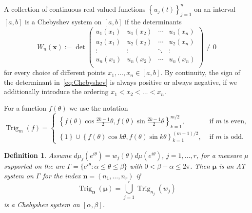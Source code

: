 \documentclass[reqno,centertags,11pt,draft]{amsart}
\newtheorem{defn}[thm]{Definition}
\newcommand{\T}{\mathbb{\partial\mathbb{D}}}
\newcommand{\set}[1]{\left\{#1\right\}}
\begin{document}
    A collection of continuous real-valued functions $\set{u_j(t)}_{j=1}^n$ on an interval $[a,b]$ is a Chebyshev system on $[a,b]$ if the determinants
    \begin{equation}\label{eq:Chebyshev}
        W_n(\bm{x}):=\det
        \begin{pmatrix}
            u_1(x_1) & u_1(x_2) & \cdots & u_1(x_n) \\
            u_2(x_1) & u_2(x_2) & \cdots & u_2(x_n) \\
            \vdots & \vdots & \ddots & \vdots \\
            u_n(x_1) & u_n(x_2) & \cdots & u_n(x_n) \\
        \end{pmatrix} \ne 0
    \end{equation}
    for every choice of different points $x_1,\ldots,x_n\in[a,b]$. By continuity, the sign of the determinant in~\eqref{eq:Chebyshev} is always positive or always negative, if we additionally introduce the ordering $x_1<x_2<\ldots<x_n$. %

    For a function $f(\theta)$ we use the notation
    \begin{equation}
        \operatorname{Trig}_m(f) = \begin{cases}
            \set{f(\theta)\cos{\frac{2k-1}{2}\theta},f(\theta)\sin{\frac{2k-1}{2}\theta}}_{k = 1}^{m/2}, & \mbox{ if } m \mbox{ is even},
            \\
            \set{1}\cup\set{f(\theta)\cos{k\theta},f(\theta)\sin{k\theta}}_{k = 1}^{(m-1)/2}, & \mbox{ if } m \mbox{ is odd}.
        \end{cases}
    \end{equation}

    \begin{defn}\label{def:AT}
        Assume $d\mu_j(e^{i\theta})=w_j(\theta)d\mu(e^{i\theta})$, $j = 1,\dots,r$, for a measure $\mu$ supported on the arc $\Gamma = \{e^{i\theta}:\alpha\le \theta\le \beta\}$ with $0<\beta-\alpha\le 2\pi$. Then $\bm{\mu}$ is an AT system on $\Gamma$ for the index $\bm{n} = (n_1,\ldots,n_r)$ if 
        \begin{equation}\label{eq:AT}
            \operatorname{Trig}_{\bm{n}}(\bm{\mu}) = \bigcup_{j=1}^r \operatorname{Trig}_{n_j}(w_j)
        \end{equation}
        is a Chebyshev system on $[\alpha,\beta]$.
    \end{defn}
\end{document}
